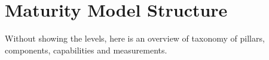 \pagebreak
\section{Maturity Model Structure}\label{sec:ekg-mm-structure}

Without showing the levels, here is an overview of taxonomy of pillars, components, 
capabilities and measurements.

%
%
%
%
%
\bgroup

